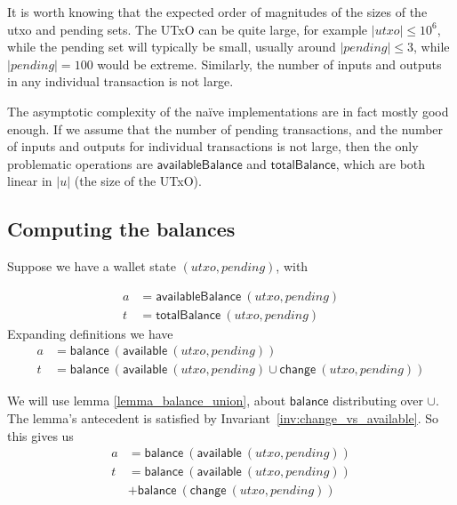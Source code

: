 \documentclass{article}
\begin{document}
It is worth knowing that the expected order of magnitudes of the sizes of the
utxo and pending sets. The UTxO can be quite large, for example
$|utxo| \leq 10^6$, while the pending set will typically be small, usually
around $|pending| \leq 3$, while $|pending| = 100$ would be extreme. Similarly,
the number of inputs and outputs in any individual transaction is not large.

The asymptotic complexity of the na\"ive implementations are in fact mostly
good enough. If we assume that the number of pending transactions, and the
number of inputs and outputs for individual transactions is not large,
then the only problematic operations are $\mathsf{availableBalance}$ and
$\mathsf{totalBalance}$, which are both linear in $|u|$ (the size of the UTxO).

\subsection{Computing the balances}

Suppose we have a wallet state $(utxo, pending)$, with

\begin{equation*}
\begin{split}
a & = \mathsf{availableBalance} ~ (utxo, pending) \\
t & = \mathsf{totalBalance} ~ (utxo, pending)
\end{split}
\end{equation*}
Expanding definitions we have
\begin{equation*}
\begin{split}
a & = \mathsf{balance} ~ (\mathsf{available} ~ (utxo, pending)) \\
t & = \mathsf{balance} ~ (\mathsf{available} ~ (utxo, pending) \cup \mathsf{change} ~ (utxo, pending))
\end{split}
\end{equation*}

We will use lemma \ref{lemma_balance_union}, about $\mathsf{balance}$
distributing over $\cup$. The lemma's antecedent is satisfied by
Invariant~\ref{inv:change_vs_available}. So this gives us
\begin{equation*}
\begin{split}
a & = \mathsf{balance} ~ (\mathsf{available} ~ (utxo, pending)) \\
t & = \mathsf{balance} ~ (\mathsf{available} ~ (utxo, pending)) \\
  & + \mathsf{balance} ~ (\mathsf{change} ~ (utxo, pending))
\end{split}
\end{equation*}
\end{document}
